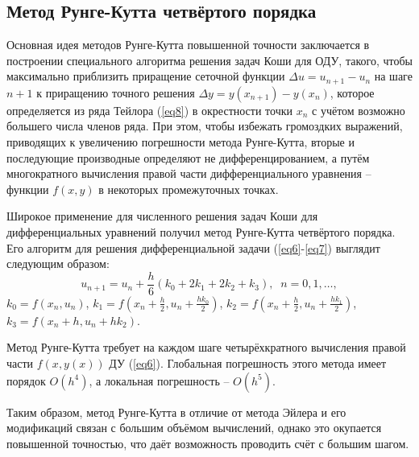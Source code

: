 \documentclass[
11pt,
master, %
subf, %
href, %
colorlinks=true, %
times, %
]{disser}
\begin{document}
\subsection{Метод Рунге-Кутта четвёртого порядка}
Основная идея методов Рунге-Кутта повышенной точности заключается в построении специального алгоритма решения задач Коши для ОДУ, такого, чтобы максимально приблизить приращение сеточной функции $\Delta u = u_{n+1} - u_n$ на шаге $n+1$ к приращению точного решения $\Delta y = y(x_{n+1}) - y(x_n)$, которое определяется из ряда Тейлора (\ref{eq8}) в окрестности точки $x_n$ с учётом возможно большего числа членов ряда. При этом, чтобы избежать громоздких выражений, приводящих к увеличению погрешности метода Рунге-Кутта, вторые и последующие производные определяют не дифференцированием, а путём многократного вычисления правой части дифференциального уравнения -- функции $f(x,y)$ в некоторых
промежуточных точках.

Широкое применение для численного решения задач Коши для дифференциальных уравнений получил метод Рунге-Кутта четвёртого порядка. Его алгоритм для решения дифференциальной
задачи (\ref{eq6}-\ref{eq7}) выглядит следующим образом:
\begin{equation}\label{eq21}
  u_{n+1} = u_n + \frac{h}{6}(k_0 + 2k_1 + 2k_2 + k_3),\;\; n = 0,1,\ldots,
\end{equation}
$k_0 = f(x_n, u_n)$, $k_1 = f\left(x_n + \frac{h}{2}, u_n + \frac{hk_0}{2}\right)$, $k_2 = f\left(x_n + \frac{h}{2}, u_n + \frac{hk_1}{2}\right)$, $k_3 = f(x_n + h, u_n + hk_2)$.

Метод Рунге-Кутта требует на каждом шаге четырёхкратного вычисления правой части $f(x,y(x))$ ДУ (\ref{eq6}). Глобальная погрешность этого метода имеет порядок $O(h^4)$, а локальная погрешность -- $O(h^5)$.

Таким образом, метод Рунге-Кутта в отличие от метода Эйлера и его модификаций связан с большим объёмом вычислений, однако это окупается повышенной точностью, что даёт возможность проводить счёт с большим шагом.


\newpage
\end{document}
